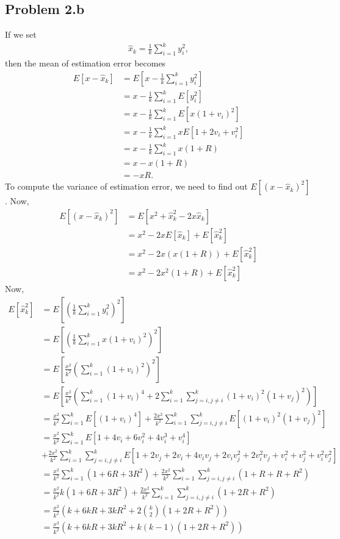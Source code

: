 \subsection*{Problem 2.b}
If we set
\begin{align*}
	\hat{x}_k = \frac{1}{k}\sum_{i=1}^{k}y_i^2,
\end{align*}
then the mean of estimation error becomes
\begin{align*}
	E[x-\hat{x}_k] &= E\left[x-\frac{1}{k}\sum_{i=1}^{k}y_i^2\right]\\
	&= x-\frac{1}{k}\sum_{i=1}^{k}E[y_i^2]\\
	&= x-\frac{1}{k}\sum_{i=1}^{k}E[x(1+v_i)^2]\\
	&= x-\frac{1}{k}\sum_{i=1}^{k}xE[1+2v_i+v_i^2]\\
	&= x-\frac{1}{k}\sum_{i=1}^{k}x(1+R)\\
	&= x-x(1+R)\\
	&= -xR.
\end{align*}
To compute the variance of estimation error, we need to find out $E[(x-\hat{x}_k)^2]$. Now,
\begin{align}\label{eq:q2b_1}
	E[(x-\hat{x}_k)^2] &= E[x^2+\hat{x}_k^2-2x\hat{x}_k]\nonumber\\
	&= x^2-2xE[\hat{x}_k]+E[\hat{x}_k^2]\nonumber\\
	&= x^2-2x(x(1+R))+E[\hat{x}_k^2]\nonumber\\
	&= x^2-2x^2(1+R)+E[\hat{x}_k^2]
\end{align}
Now,
\begin{align*}
	E[\hat{x}_k^2] &= E\left[ \left( \frac{1}{k}\sum_{i=1}^{k}y_i^2 \right)^2\right]\\
	&= E\left[\left(\frac{1}{k}\sum_{i=1}^{k}x(1+v_i)^2\right)^2\right]\\
	&= E\left[\frac{x^2}{k^2}\left(\sum_{i=1}^{k}(1+v_i)^2\right)^2\right]\\
	&= E\left[\frac{x^2}{k^2}\left(\sum_{i=1}^{k}(1+v_i)^4+2\sum_{i=1}^{k}\sum_{j=i,j\neq i}^{k}(1+v_i)^2(1+v_j)^2\right)\right]\\
	&= \frac{x^2}{k^2}\sum_{i=1}^{k}E\left[(1+v_i)^4\right]+\frac{2x^2}{k^2}\sum_{i=1}^{k}\sum_{j=i,j\neq i}^{k}E\left[(1+v_i)^2(1+v_j)^2\right]\\
	&= \frac{x^2}{k^2}\sum_{i=1}^{k}E\left[1+4v_i+6v_i^2+4v_i^3+v_i^4\right]\\
	&+\frac{2x^2}{k^2}\sum_{i=1}^{k}\sum_{j=i,j\neq i}^{k}E\left[1+2v_j+2v_i+4v_iv_j+2v_iv_j^2+2v_i^2v_j+v_i^2+v_j^2+v_i^2v_j^2\right]\\
	&= \frac{x^2}{k^2}\sum_{i=1}^{k}(1+6R+3R^2)+\frac{2x^2}{k^2}\sum_{i=1}^{k}\sum_{j=i,j\neq i}^{k}(1+R+R+R^2)\\
	&= \frac{x^2}{k^2}k(1+6R+3R^2)+\frac{2x^2}{k^2}\sum_{i=1}^{k}\sum_{j=i,j\neq i}^{k}(1+2R+R^2)\\
	&= \frac{x^2}{k^2}\left(k+6kR+3kR^2+2 {k \choose 2} (1+2R+R^2)\right)\\
	&= \frac{x^2}{k^2}\left(k+6kR+3kR^2 + k(k-1)(1+2R+R^2)\right)
\end{align*}
